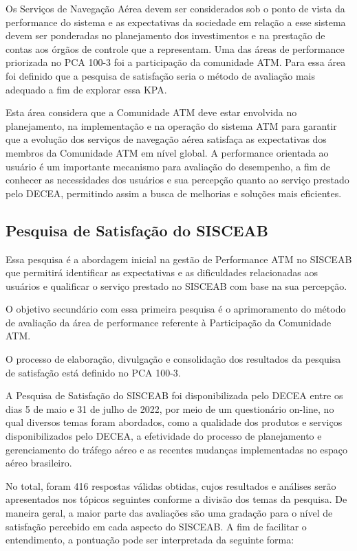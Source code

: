 \documentclass[
]{book}
\begin{document}
Os Serviços de Navegação Aérea devem ser considerados sob o ponto de vista da performance do sistema e as expectativas da sociedade em relação a esse sistema devem ser ponderadas no planejamento dos investimentos e na prestação de contas aos órgãos de controle que a representam.
Uma das áreas de performance priorizada no PCA 100-3 foi a participação da comunidade ATM. Para essa área foi definido que a pesquisa de satisfação seria o método de avaliação mais adequado a fim de explorar essa KPA.

Esta área considera que a Comunidade ATM deve estar envolvida no planejamento, na implementação e na operação do sistema ATM para garantir que a evolução dos serviços de navegação aérea satisfaça as expectativas dos membros da Comunidade ATM em nível global.
A performance orientada ao usuário é um importante mecanismo para avaliação do desempenho, a fim de conhecer as necessidades dos usuários e sua percepção quanto ao serviço prestado pelo DECEA, permitindo assim a busca de melhorias e soluções mais eficientes.

\hypertarget{pesquisa-de-satisfauxe7uxe3o-do-sisceab}{%
\subsection{Pesquisa de Satisfação do SISCEAB}\label{pesquisa-de-satisfauxe7uxe3o-do-sisceab}}

Essa pesquisa é a abordagem inicial na gestão de Performance ATM no SISCEAB que permitirá identificar as expectativas e as dificuldades relacionadas aos usuários e qualificar o serviço prestado no SISCEAB com base na sua percepção.

O objetivo secundário com essa primeira pesquisa é o aprimoramento do método de avaliação da área de performance referente à Participação da Comunidade ATM.

O processo de elaboração, divulgação e consolidação dos resultados da pesquisa de satisfação está definido no PCA 100-3.

A Pesquisa de Satisfação do SISCEAB foi disponibilizada pelo DECEA entre os dias 5 de maio e 31 de julho de 2022, por meio de um questionário on-line, no qual diversos temas foram abordados, como a qualidade dos produtos e serviços disponibilizados pelo DECEA, a efetividade do processo de planejamento e gerenciamento do tráfego aéreo e as recentes mudanças implementadas no espaço aéreo brasileiro.

No total, foram 416 respostas válidas obtidas, cujos resultados e análises serão apresentados nos tópicos seguintes conforme a divisão dos temas da pesquisa.
De maneira geral, a maior parte das avaliações são uma gradação para o nível de satisfação percebido em cada aspecto do SISCEAB. A fim de facilitar o entendimento, a pontuação pode ser interpretada da seguinte forma:
\end{document}
